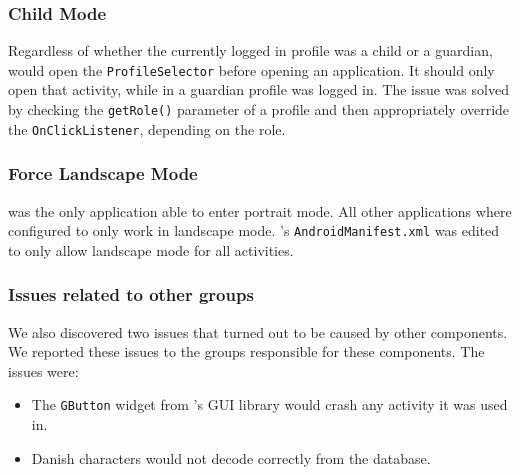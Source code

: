 \subsubsection{Child Mode}
Regardless of whether the currently logged in profile was a child or a guardian, \launcher would open the \lstinline{ProfileSelector} before opening an application.
It should only open that activity, while in a guardian profile was logged in.
The issue was solved by checking the \lstinline{getRole()} parameter of a profile and then appropriately override the \lstinline{OnClickListener}, depending on the role. 

\subsubsection{Force Landscape Mode}
\launcher was the only application able to enter portrait mode. 
All other \giraf applications where configured to only work in landscape mode.
\launcher's \lstinline{AndroidManifest.xml} was edited to only allow landscape mode for all activities.

\subsubsection{Issues related to other groups}
We also discovered two issues that turned out to be caused by other \giraf components. We reported these issues to the groups responsible for these components. The issues were:

\begin{itemize}
\item The \lstinline{GButton} widget from \giraf's GUI library would crash any activity it was used in.
\item Danish characters would not decode correctly from the database.
\end{itemize}
